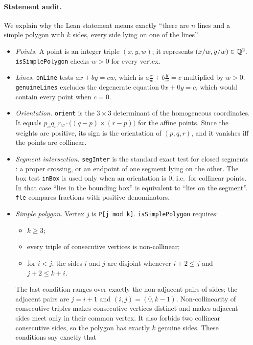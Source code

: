 \paragraph{Statement audit.} We explain why the Lean statement means exactly ``there are $n$ lines and a
simple polygon with $k$ sides, every side lying on one of the lines''.
\begin{itemize}
\item \emph{Points.} A point is an integer triple $(x,y,w)$; it represents $(x/w,y/w)\in\mathbb Q^2$.
  \texttt{isSimplePolygon} checks $w>0$ for every vertex.
\item \emph{Lines.} \texttt{onLine} tests $ax+by=cw$, which is $a\frac xw+b\frac yw=c$ multiplied by
  $w>0$. \texttt{genuineLines} excludes the degenerate equation $0x+0y=c$, which would contain every
  point when $c=0$.
\item \emph{Orientation.} \texttt{orient} is the $3\times3$ determinant of the homogeneous coordinates.
  It equals $p_wq_wr_w\cdot\bigl((q-p)\times(r-p)\bigr)$ for the affine points. Since the weights are
  positive, its sign is the orientation of $(p,q,r)$, and it vanishes iff the points are collinear.
\item \emph{Segment intersection.} \texttt{segInter} is the standard exact test for closed segments
  \cite[\S33.1]{CLRS}: a proper crossing, or an endpoint of one segment lying on the other. The box
  test \texttt{inBox} is used only when an orientation is $0$, i.e.\ for collinear points. In that case
  ``lies in the bounding box'' is equivalent to ``lies on the segment''. \texttt{fle} compares fractions
  with positive denominators.
\item \emph{Simple polygon.} Vertex $j$ is \texttt{P[j mod k]}. \texttt{isSimplePolygon} requires:
  \begin{itemize}
  \item $k\ge 3$;
  \item every triple of consecutive vertices is non-collinear;
  \item for $i<j$, the sides $i$ and $j$ are disjoint whenever $i+2\le j$ and $j+2\le k+i$.
  \end{itemize}
  The last condition ranges over exactly the non-adjacent pairs of sides; the adjacent pairs are
  $j=i+1$ and $(i,j)=(0,k-1)$. Non-collinearity of consecutive triples makes consecutive vertices
  distinct and makes adjacent sides meet only in their common vertex. It also forbids two collinear
  consecutive sides, so the polygon has exactly $k$ genuine sides. These conditions say exactly that

\end{itemize}
